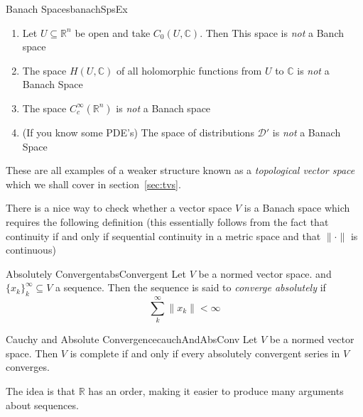 \documentclass[oneside]{book}
\newcommand{\R}{\mathbb{R}}
\newcommand{\C}{\mathbb{C}}
\newcommand{\CD}{\mathcal{D}}
\newcommand{\sse}{\subseteq}
\begin{document}
\begin{example}{Banach Spaces}{banachSpsEx}
\begin{enumerate}
			it is not a Banach space, not being complete. It is easy to se that $C_c(X)$, the set of
			continuous bounded function, is a banach space and contains $C_c(X)$, and so it suffices to
			find the closure of $C_c(X)$ in $C_b(X)$. The closure turns out to be $C_0(X)$.
		\item Let $U \sse \R^n$ be open and take $C_0(U, \C)$. Then This space is \emph{not} a Banch space
		\item The space $H(U, \C)$ of all holomorphic functions from $U$ to $\C$ is \emph{not} a Banach Space
		\item The space $C_c^\infty(\R^n)$ is \emph{not} a Banach space
		\item (If you know some PDE's) The space of distributions $\CD'$ is \emph{not} a Banach Space
	\end{enumerate}
	These are all examples of a weaker structure known as a \emph{topological vector space} which we shall cover in
	section~\ref{sec:tvs}.
\end{example}

There is a nice way to check whether a vector space $V$ is a Banach space which requires the following definition (this
essentially follows from the fact that continuity if and only if sequential continuity in a metric space and that
$\|\cdot\|$ is continuous)

\begin{defn}{Absolutely Convergent}{absConvergent}
	Let $V$ be a normed vector space. and $\{x_k\}_k^\infty \sse V$ a sequence. Then the sequence is said to
	\emph{converge absolutely} if
	\[
		\sum_k^\infty \|x_k\| < \infty
	\]
\end{defn}

\begin{lem}{Cauchy and Absolute Convergence}{cauchAndAbsConv}
	Let $V$ be a normed vector space. Then $V$ is complete if and only if every absolutely convergent series in $V$
	converges.
\end{lem}

The idea is that $\R$ has an order, making it easier to produce many arguments about sequences.
\end{document}
